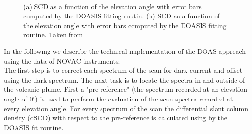 \\
\begin{figure}
	\caption{(a)  SCD as a function of the elevation angle with error bars computed by the DOASIS fitting routin. (b)  SCD as a function of the elevation angle with error bars computed by the DOASIS fitting routine.  Taken from \cite{WarnachSimon}}
	\label{fig:plumeref}
\end{figure}
%
In the following we describe the technical implementation of the DOAS approach using the data of NOVAC instruments:\\
%
The first step is to correct each spectrum of the scan for dark current and offset using the dark spectrum.
The next task is to locate the spectra in and outside of the volcanic plume.
First a "pre-reference" (the spectrum recorded at an elevation angle of  0$^{\circ} $) is used to perform the evaluation of the scan spectra recorded at every elevation angle.
For every spectrum of the scan the  differential slant column density (dSCD) with respect to the pre-reference is calculated using  by the DOASIS fit routine.

